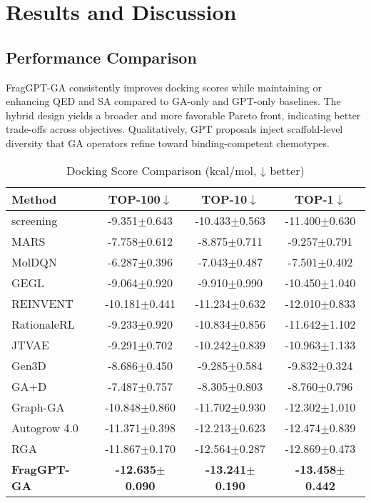 \documentclass[lettersize,journal]{IEEEtran}
\begin{document}
\section{Results and Discussion}
\subsection{Performance Comparison}
FragGPT-GA consistently improves docking scores while maintaining or enhancing QED and SA compared to GA-only and GPT-only baselines. The hybrid design yields a broader and more favorable Pareto front, indicating better trade-offs across objectives. Qualitatively, GPT proposals inject scaffold-level diversity that GA operators refine toward binding-competent chemotypes.

\begin{table}[!t]
    \caption{Docking Score Comparison (kcal/mol, ↓ better)}
    \label{tab:docking_scores}
    \centering    
    \small
    \setlength{\tabcolsep}{4pt}
    
    \begin{tabular}{l c c c}
        \hline\hline
        Method & TOP-100$\downarrow$ & TOP-10$\downarrow$ & TOP-1$\downarrow$ \\
        \hline
        screening & -9.351$\pm$0.643 & -10.433$\pm$0.563 & -11.400$\pm$0.630 \\
        MARS & -7.758$\pm$0.612 & -8.875$\pm$0.711 & -9.257$\pm$0.791 \\
        MolDQN & -6.287$\pm$0.396 & -7.043$\pm$0.487 & -7.501$\pm$0.402 \\
        GEGL & -9.064$\pm$0.920 & -9.910$\pm$0.990 & -10.450$\pm$1.040 \\
        REINVENT & -10.181$\pm$0.441 & -11.234$\pm$0.632 & -12.010$\pm$0.833 \\
        RationaleRL & -9.233$\pm$0.920 & -10.834$\pm$0.856 & -11.642$\pm$1.102 \\
        JTVAE & -9.291$\pm$0.702 & -10.242$\pm$0.839 & -10.963$\pm$1.133 \\
        Gen3D & -8.686$\pm$0.450 & -9.285$\pm$0.584 & -9.832$\pm$0.324 \\
        GA+D & -7.487$\pm$0.757 & -8.305$\pm$0.803 & -8.760$\pm$0.796 \\
        Graph-GA & -10.848$\pm$0.860 & -11.702$\pm$0.930 & -12.302$\pm$1.010 \\
        Autogrow 4.0 & -11.371$\pm$0.398 & -12.213$\pm$0.623 & -12.474$\pm$0.839 \\
        RGA  & -11.867$\pm$0.170 & -12.564$\pm$0.287 & -12.869$\pm$0.473 \\             
        \hline
        \textbf{FragGPT-GA} & \textbf{-12.635$\pm$0.090} & \textbf{-13.241$\pm$0.190} & \textbf{-13.458$\pm$0.442} \\           
        \hline\hline
    \end{tabular}
\end{table}
\end{document}

